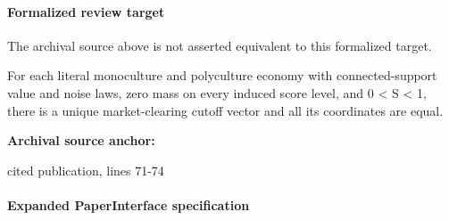 \documentclass[10pt]{article}
\begin{document}
\paragraph{Formalized review target}
The archival source above is not asserted equivalent to this formalized target.
\begin{ReviewVerbatim}
For each literal monoculture and polyculture economy with connected-support value and noise laws, zero mass on every induced score level, and 0 < S < 1, there is a unique market-clearing cutoff vector and all its coordinates are equal.
\end{ReviewVerbatim}

\textbf{Archival source anchor:} {\footnotesize\raggedright cited publication, lines 71-\allowbreak{}74\par}
\paragraph{Expanded PaperInterface specification}
\end{document}

